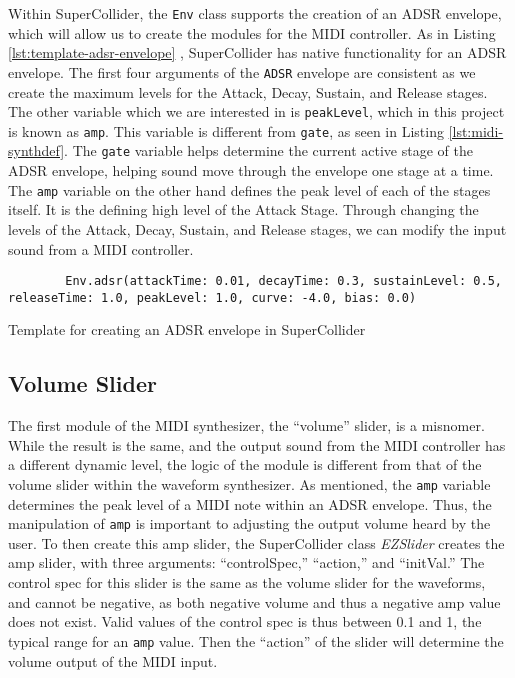 Within SuperCollider, the \texttt{Env} class supports the creation of an ADSR envelope, which will allow us to create the modules for the MIDI controller. As in Listing \ref{lst:template-adsr-envelope}  \cite{McCartney_2021}, SuperCollider has native functionality for an ADSR envelope. The first four arguments of the \texttt{ADSR} envelope are consistent as we create the maximum levels for the Attack, Decay, Sustain, and Release stages. The other variable which we are interested in is \texttt{peakLevel}, which in this project is known as \texttt{amp}. This variable is different from \texttt{gate}, as seen in Listing \ref{lst:midi-synthdef}. The \texttt{gate} variable helps determine the current active stage of the ADSR envelope, helping sound move through the envelope one stage at a time. The \texttt{amp} variable on the other hand defines the peak level of each of the stages itself. It is the defining high level of the Attack Stage. Through changing the levels of the Attack, Decay, Sustain, and Release stages, we can modify the input sound from a MIDI controller. 

\begin{listing}
	\begin{lstlisting}
		Env.adsr(attackTime: 0.01, decayTime: 0.3, sustainLevel: 0.5, releaseTime: 1.0, peakLevel: 1.0, curve: -4.0, bias: 0.0)
	\end{lstlisting}	
	\caption{Template for creating an ADSR envelope in SuperCollider}
	\label{lst:template-adsr-envelope}
\end{listing}


\subsection{Volume Slider}

The first module of the MIDI synthesizer, the ``volume'' slider, is a misnomer. While the result is the same, and the output sound from the MIDI controller has a different dynamic level, the logic of the module is different from that of the volume slider within the waveform synthesizer. As mentioned, the \texttt{amp} variable determines the peak level of a MIDI note within an ADSR envelope. Thus, the manipulation of \texttt{amp} is important to adjusting the output volume heard by the user. To then create this amp slider, the SuperCollider class \textit{EZSlider} creates the amp slider, with three arguments: ``controlSpec,'' ``action,'' and ``initVal.'' The control spec for this slider is the same as the volume slider for the waveforms, and cannot be negative, as both negative volume and thus a negative amp value does not exist. Valid values of the control spec is thus between 0.1 and 1, the typical range for an \texttt{amp} value. Then the ``action'' of the slider will determine the volume output of the MIDI input. 

